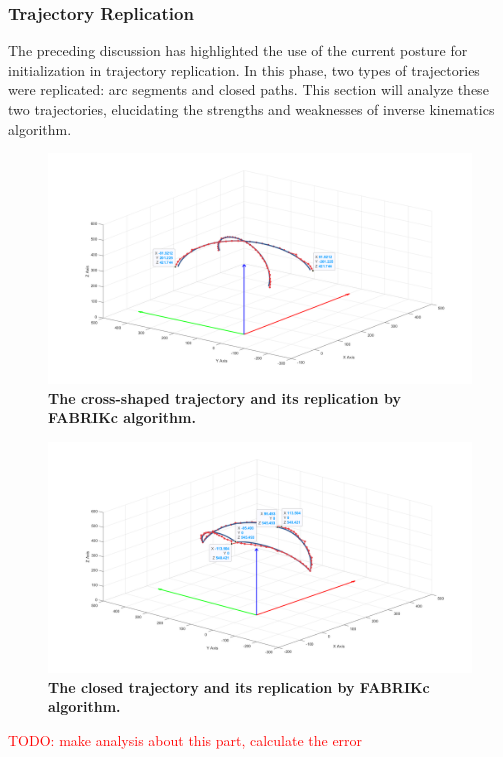 \subsubsection{Trajectory Replication}
The preceding discussion has highlighted the use of the current posture for initialization in trajectory 
replication. In this phase, two types of trajectories were replicated: arc segments and closed paths. This 
section will analyze these two trajectories, elucidating the strengths and weaknesses of inverse kinematics 
algorithm. \\
\begin{figure}[H] %
    \centering %
    \captionsetup{labelsep=colon}
    \includegraphics[width=1.0\textwidth]{Image/Result/cross_trajectory_replication_with_label.png} 
    \caption[The cross-shaped trajectory and its replication by FABRIKc algorithm]
    {\centering \textbf{The cross-shaped trajectory and its replication by FABRIKc algorithm.}}
    \label{fig:tr_cross}
\end{figure}
\begin{figure}[H] %
    \centering %
    \captionsetup{labelsep=colon}
    \includegraphics[width=1.0\textwidth]{Image/Result/circle_trajectory_replication_with_label.png} 
    \caption[The closed trajectory and its replication by FABRIKc algorithm]
    {\centering \textbf{The closed trajectory and its replication by FABRIKc algorithm.}}
    \label{fig:clc_cross}
\end{figure}
\textcolor{red}{TODO: make analysis about this part, calculate the error}

